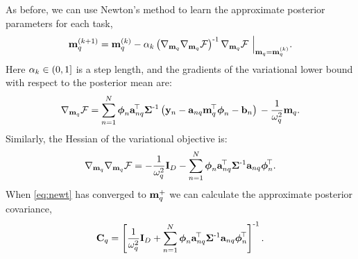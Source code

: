 As before, we can use Newton's method to learn the approximate posterior
parameters for each task,
\begin{equation}
    \mathbf{m}_{q}^{(k+1)} = \mathbf{m}_{q}^{(k)} - \alpha_k
        \left({\nabla_{\mathbf{m}_q} \nabla_{\mathbf{m}_q} \mathcal{F}}\right)^{\text{-}1}
        \nabla_{\mathbf{m}_q} \mathcal{F} ~ \Big|_{\mathbf{m}_q = \mathbf{m}_{q}^{(k)}}.
        \label{eq:newt}
\end{equation}
Here $\alpha_k \in (0, 1]$ is a step length, and the gradients of the 
variational lower bound with respect to the posterior mean are:
\begin{equation}
    \nabla_{\mathbf{m}_q} \mathcal{F} = \sum^N_{n=1} \boldsymbol\phi_n \mathbf{a}_{nq}^{\!\top}
        \mathbf{\Sigma}^{\text{-}1}
        \left({\mathbf{y}_n - \mathbf{a}_{nq}\mathbf{m}_q^{\!\top}\boldsymbol\phi_n - \mathbf{b}_n}\right)  \\
        - \frac{1}{\omega^2_q} \mathbf{m}_q \text{.}
 \end{equation}     
%
Similarly, the Hessian of the variational objective is: 
\begin{equation}     
    \nabla_{\mathbf{m}_q} \nabla_{\mathbf{m}_q} \mathcal{F} =
       - \frac{1}{\omega^2_q}  \mathbf{I}_{D}
        - \sum^N_{n=1} \boldsymbol\phi_n\mathbf{a}_{nq}^{\!\top}\mathbf{\Sigma}^{\text{-}1}
        \mathbf{a}_{nq}\boldsymbol\phi_n^{\!\top}.
\end{equation}
When \eqref{eq:newt} has converged to $\mathbf{m}_q^{+}$ we can calculate the
approximate posterior covariance,
\begin{equation}
    \mathbf{C}_q 
    = \left[{ \frac{1}{\omega^2_q} \mathbf{I}_{D}
        + \sum^N_{n=1} \boldsymbol\phi_n\mathbf{a}_{nq}^{\!\top}\mathbf{\Sigma}^{\text{-}1}
        \mathbf{a}_{nq}\boldsymbol\phi_n^{\!\top}}\right]^{\text{-}1}.
\end{equation}
 
